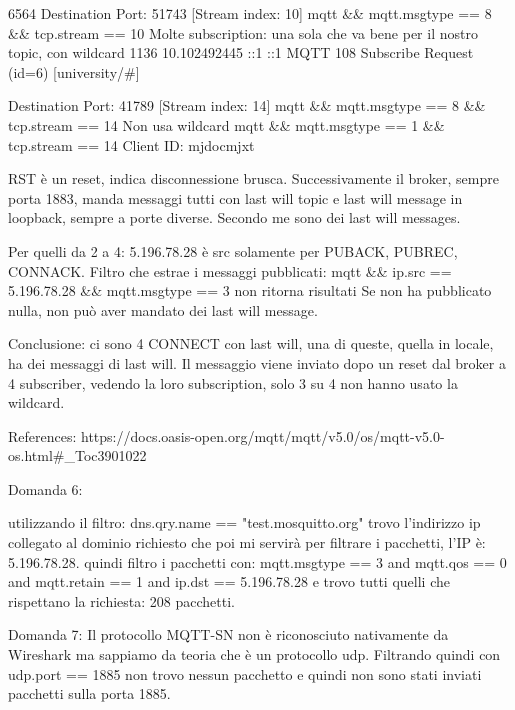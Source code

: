 6564
Destination Port: 51743
[Stream index: 10]
mqtt \&\& mqtt.msgtype == 8 \&\& tcp.stream == 10
Molte subscription: una sola che va bene per il nostro topic, con wildcard 
1136	10.102492445	::1	::1	MQTT	108	Subscribe Request (id=6) [university/#]

Destination Port: 41789
[Stream index: 14]
mqtt \&\& mqtt.msgtype == 8 \&\& tcp.stream == 14
Non usa wildcard
mqtt \&\& mqtt.msgtype == 1 \&\& tcp.stream == 14
Client ID: mjdocmjxt

RST è un reset, indica disconnessione brusca.
Successivamente il broker, sempre porta 1883, manda messaggi tutti con last will topic e last will message in loopback, sempre a porte diverse.
Secondo me sono dei last will messages.

Per quelli da 2 a 4:
5.196.78.28 è src solamente per PUBACK, PUBREC, CONNACK.
Filtro che estrae i messaggi pubblicati:
mqtt \&\& ip.src == 5.196.78.28 \&\& mqtt.msgtype == 3 
non ritorna risultati
Se non ha pubblicato nulla, non può aver mandato dei last will message.

Conclusione: ci sono 4 CONNECT con last will, una di queste, quella in locale, ha dei messaggi di last will. 
Il messaggio viene inviato dopo un reset dal broker a 4 subscriber, vedendo la loro subscription, solo 3 su 4 non hanno usato la wildcard.

References:
https://docs.oasis-open.org/mqtt/mqtt/v5.0/os/mqtt-v5.0-os.html#_Toc3901022


Domanda 6:

utilizzando il filtro: dns.qry.name == "test.mosquitto.org" trovo l'indirizzo ip collegato al dominio richiesto che poi mi servirà per filtrare i pacchetti, l'IP è:  5.196.78.28.
quindi filtro i pacchetti con: mqtt.msgtype == 3 and mqtt.qos == 0 and mqtt.retain == 1 and ip.dst == 5.196.78.28 e trovo tutti quelli che rispettano la richiesta: 208 pacchetti.


Domanda 7: 
Il protocollo MQTT-SN non è riconosciuto nativamente da Wireshark ma sappiamo da teoria che è un protocollo udp. Filtrando quindi con udp.port == 1885 non trovo nessun pacchetto e quindi non sono stati inviati pacchetti sulla porta 1885.












